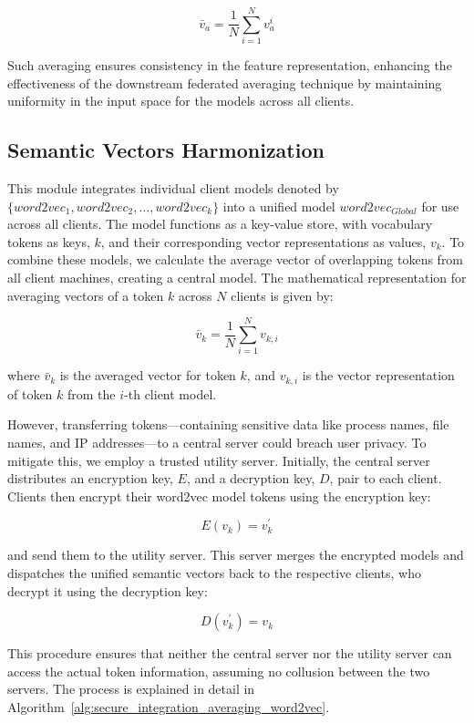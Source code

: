 \[
\bar{v}_a = \frac{1}{N} \sum_{i=1}^{N} v_a^i
\]

Such averaging ensures consistency in the feature representation, enhancing the effectiveness of the downstream federated averaging technique by maintaining uniformity in the input space for the \gnnshort models across all clients.

\subsection{Semantic Vectors Harmonization}
\label{semanticharmonization}


This module integrates individual client \wordvec models denoted by \(\{word2vec_1, word2vec_2, \ldots, word2vec_k\} \) into a unified model \( word2vec_{Global} \) for use across all clients. The \wordvec model functions as a key-value store, with vocabulary tokens as keys, \(k\), and their corresponding vector representations as values, \(v_k\). To combine these models, we calculate the average vector of overlapping tokens from all client machines, creating a central model. The mathematical representation for averaging vectors of a token \(k\) across \(N\) clients is given by:

\[
\bar{v}_k = \frac{1}{N} \sum_{i=1}^{N} v_{k,i}
\]

where \(\bar{v}_k\) is the averaged vector for token \(k\), and \(v_{k,i}\) is the vector representation of token \(k\) from the \(i\)-th client model.

However, transferring tokens—containing sensitive data like process names, file names, and IP addresses—to a central server could breach user privacy. To mitigate this, we employ a trusted utility server. Initially, the central server distributes an encryption key, \(E\), and a decryption key, \(D\), pair to each client. Clients then encrypt their word2vec model tokens using the encryption key:

\[
E(v_{k}) = v_{k}^{'}
\]

and send them to the utility server. This server merges the encrypted models and dispatches the unified semantic vectors back to the respective clients, who decrypt it using the decryption key:

\[
D(v_{k}^{'}) = v_{k}
\]

This procedure ensures that neither the central server nor the utility server can access the actual token information, assuming no collusion between the two servers. The process is explained in detail in Algorithm~\ref{alg:secure_integration_averaging_word2vec}.

